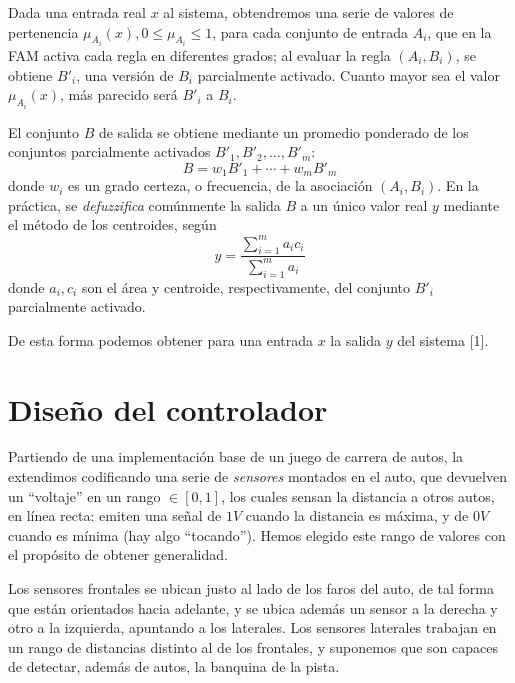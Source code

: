 \documentclass[conference,spanish,a4paper,10pt,oneside,final]{tfmpd}
\begin{document}

Dada una entrada real $x$ al sistema, obtendremos una serie de valores de
pertenencia $\mu_{A_{i}}(x), 0\leq\mu_{A_{i}}\leq1$, para cada conjunto de entrada $A_i$, que en la
FAM activa cada regla en diferentes grados;
al evaluar la regla $(A_i,B_i)$, se obtiene $B'_i$,
una versión de $B_i$ parcialmente activado.
Cuanto mayor sea el valor $\mu_{A_{i}}(x)$, más parecido será $B'_i$ a $B_i$.

El conjunto $B$ de salida se obtiene mediante un promedio ponderado de los
conjuntos parcialmente activados $B'_1,B'_2,\ldots,B'_m$:
\begin{equation}
B=w_1B'_1+\cdots+w_mB'_m
\end{equation}
donde $w_i$ es un grado certeza, o frecuencia, de la asociación $(A_i,B_i)$.
En la práctica, se \emph{defuzzifica} comúnmente la salida $B$ a un único
valor real $y$ mediante el método de los centroides, según
\begin{equation}
y=\frac{\sum_{i=1}^{m}{a_ic_i}}{\sum_{i=1}^{m}{a_i}}
\end{equation}
donde $a_i,c_i$ son el área y centroide, respectivamente, del conjunto $B'_i$ parcialmente
activado.

De esta forma podemos obtener para una entrada $x$ la salida $y$ del sistema [1].
%
%
%
%
\section{Diseño del controlador}
Partiendo de una implementación base de un juego de carrera de autos, 
la extendimos codificando una serie de \emph{sensores} montados en
el auto, que devuelven un ``voltaje'' en un rango $\in [0,1]$, los cuales sensan
la distancia a otros autos, en línea recta: emiten una señal de $1V$ cuando
la distancia es máxima, y de $0V$ cuando es mínima (hay algo ``tocando'').
Hemos elegido este rango de valores con el propósito de obtener generalidad.

Los sensores frontales se ubican justo al lado de los faros del auto, de tal
forma que están orientados hacia adelante, y se ubica además un sensor a la 
derecha y otro a la izquierda, apuntando a los laterales.
Los sensores laterales trabajan en un rango de distancias distinto al de los
frontales, y suponemos que son capaces de detectar, además de autos, la
banquina de la pista.
\end{document}
